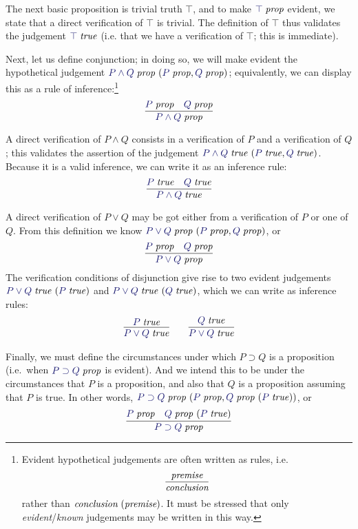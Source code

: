 The next basic proposition is trivial truth $\top$, and to make
$\isprop{\top}$ evident, we state that a direct verification of $\top$
is trivial. The definition of $\top$ thus validates the judgement
$\istrue{\top}$ (i.e. that we have a verification of $\top$; this
is immediate).

Next, let us define conjunction; in doing so, we will make evident the
hypothetical judgement $\hyp{\isprop{P\land Q}}{\isprop{P},\isprop{Q}}$;
equivalently, we can display this as a rule of inference:\footnote{
Evident hypothetical judgements are often written as rules, i.e.
\[
  \infer{\textit{conclusion}}{\textit{premise}}
\]
rather than $\textit{conclusion}\ (\textit{premise})$. It must be
stressed that only \emph{evident}/\emph{known} judgements may be
written in this way.
}
\[
  \infer{
    \isprop{P\land Q}
  }{
    \isprop{P} &
    \isprop{Q}
  }
\]

A direct verification of $P\land Q$ consists in a verification of $P$
and a verification of $Q$; this validates the assertion of the judgement
$\hyp{\istrue{P\land Q}}{\istrue{P},\istrue{Q}}$. Because it is a valid
inference, we can write it as an inference rule:
\[
  \infer{
    \istrue{P\land Q}
  }{
    \istrue{P} &
    \istrue{Q}
  }
\]

A direct verification of $P\lor Q$ may be got either from a verification
of $P$ or one of $Q$. From this definition we know $\hyp{\isprop{P\lor
Q}}{\isprop{P},\isprop{Q}}$, or
\[
  \infer{
    \isprop{P\lor Q}
  }{
    \isprop{P} &
    \isprop{Q}
  }
\]
The verification conditions of disjunction give
rise to two evident judgements $\hyp{\istrue{P\lor Q}}{\istrue{P}}$ and
$\hyp{\istrue{P\lor Q}}{\istrue{Q}}$, which we can write as inference rules:
\begin{gather*}
  \infer{
    \istrue{P\lor Q}
  }{
    \istrue{P}
  }
  \qquad
  \infer{
    \istrue{P\lor Q}
  }{
    \istrue{Q}
  }
\end{gather*}

Finally, we must define the circumstances under which $P\supset Q$ is
a proposition (i.e.\ when $\isprop{P\supset Q}$ is evident). And we
intend this to be under the circumstances that $P$ is a proposition,
and also that $Q$ is a proposition assuming that $P$ is true. In other
words, $\hyp{\isprop{P\supset Q}}{\isprop{P},
\hyp{\isprop{Q}}{\istrue{P}}}$, or
\[
  \infer{
    \isprop{P\supset Q}
  }{
    \isprop{P} &
    \hyp{\isprop{Q}}{\istrue{P}}
  }
\]

